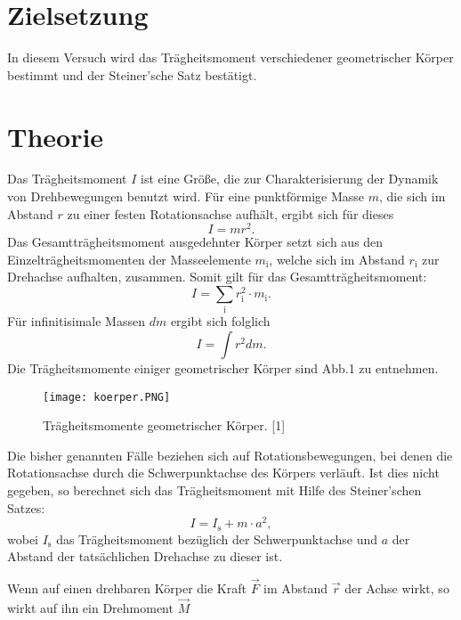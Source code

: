 \section{Zielsetzung}
\label{sec:Zielsetzung}
In diesem Versuch wird das Trägheitsmoment verschiedener
geometrischer Körper bestimmt und der Steiner'sche Satz bestätigt.



\section{Theorie}
\label{sec:Theorie}

Das Trägheitsmoment $I$ ist eine Größe, die zur Charakterisierung
der Dynamik von Drehbewegungen benutzt wird. Für eine
punktförmige Masse $m$, die sich im Abstand $r$ zu einer festen
Rotationsachse aufhält, ergibt sich für dieses
\begin{equation}
I = mr^2.
\end{equation}
Das Gesamtträgheitsmoment ausgedehnter Körper setzt sich aus den
Einzelträgheitsmomenten der Masseelemente $m_{\text{i}}$,
welche sich im Abstand $r_{\text{i}}$ zur Drehachse aufhalten,
zusammen. Somit gilt für das Gesamtträgheitsmoment:
\begin{equation}
I = \sum_{\text{i}} r_{\text{i}}^2 \cdot m_{\text{i}}.
\end{equation}
Für infinitisimale Massen $dm$ ergibt sich folglich
\begin{equation}
I = \int r^2 dm.
\end{equation}
Die Trägheitsmomente einiger geometrischer Körper sind Abb.1 zu
entnehmen.
\begin{figure}[H]
\centering
\caption{Trägheitsmomente geometrischer Körper. [1]}
\texttt{[image: koerper.PNG]}
\label{fig:koerper}
\end{figure}
Die bisher genannten Fälle beziehen sich auf Rotationsbewegungen,
bei denen die Rotationsachse durch die Schwerpunktachse des
Körpers verläuft. Ist dies nicht gegeben, so berechnet sich
das Trägheitsmoment mit Hilfe des Steiner'schen Satzes:
\begin{equation*}
I = I_{\text{s}} + m \cdot a^2,
\end{equation*}
wobei $I_{\text{s}}$ das Trägheitsmoment bezüglich der
Schwerpunktachse und $a$ der Abstand der
tatsächlichen Drehachse zu dieser ist.
\par
Wenn auf einen drehbaren Körper die Kraft $\vec{F}$ im Abstand
$\vec{r}$ der Achse wirkt, so wirkt auf ihn ein Drehmoment
$\vec{M}$

